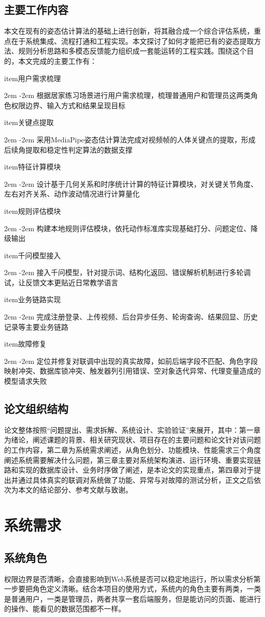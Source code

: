 \documentclass[UTF8,twoside]{ctexrep}
\makeatletter
\def@NAT@last@yr{\@citea}%
\def@NAT@last@yr{-\NAT@penalty}%
\newcommand{\listbodyaligntext}[1]{%
  \par\begingroup
    \parindent=0pt
    \parshape=2 2em \dimexpr\textwidth-2em\relax 0pt \textwidth
    \noindent\ignorespaces#1\unskip\par
  \endgroup
}
\newcommand{\researchitem}[2]{%
  \csname item\endcsname #1%
  \listbodyaligntext{#2}%
}
\makeatother
\begin{document}
\section{主要工作内容}
本文在现有的姿态估计算法的基础上进行创新，将其融合成一个综合评估系统，重点在于系统集成、流程打通和工程实现。本文探讨了如何才能把已有的姿态提取方法、规则分析思路和多模态反馈能力组织成一套能运转的工程实践。围绕这个目的，本文完成的主要工作有：
\begin{researchlist}
  \researchitem{用户需求梳理}{
    根据居家练习场景进行用户需求梳理，梳理普通用户和管理员这两类角色权限边界、输入方式和结果呈现目标
  }
  \researchitem{关键点提取}{
    采用MediaPipe姿态估计算法\cite{ref_mediapipe}完成对视频帧的人体关键点的提取，形成后续角提取和稳定性判定算法的数据支撑
  }
  \researchitem{特征计算模块}{
    设计基于几何关系和时序统计计算的特征计算模块，对关键关节角度、左右对齐关系、动作波动情况进行计算量化
  }
  \researchitem{规则评估模块}{
    构建本地规则评估模块，依托动作标准库实现基础打分、问题定位、降级输出
  }
  \researchitem{千问模型接入}{
    接入千问模型，针对提示词、结构化返回、错误解析机制进行多轮调试，让反馈文本更贴近日常教学语言
  }
  \researchitem{业务链路实现}{
    完成注册登录、上传视频、后台异步任务、轮询查询、结果回显、历史记录等主要业务链路
  }
  \researchitem{故障修复}{
    定位并修复对联调中出现的真实故障，如前后端字段不匹配、角色字段映射冲突、数据库锁冲突、触发器列引用错误、空对象迭代异常、代理变量造成的模型请求失败
  }
\end{researchlist}



\section{论文组织结构}论文整体按照“问题提出、需求拆解、系统设计、实验验证”来展开，其中：第一章为绪论，阐述课题的背景、相关研究现状、项目存在的主要问题和论文针对该问题的工作内容，第二章为系统需求阐述，从角色划分、功能模块、性能需求三个角度阐述系统需要解决什么问题，第三章主要对系统架构演进、运行环境、重要实现链路和实现的数据库设计、业务时序做了阐述，是本论文的实现重点，第四章对于提出并通过具体真实的联调对系统做了功能、异常与对故障的测试分析，正文之后依次为本文的结论部分、参考文献与致谢。


\chapter{系统需求}

\section{系统角色}
权限边界是否清晰，会直接影响到Web系统是否可以稳定地运行，所以需求分析第一步要把角色定义清晰。结合本项目的使用方式，系统内的角色主要有两类，一类是普通用户，一类是管理员，两者共享一套后端服务，但是能访问的页面、能进行的操作、能看见的数据范围都不一样。
\end{document}
